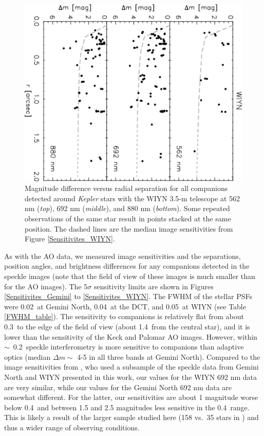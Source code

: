 \documentclass[twocolumn,appendixfloats]{aastex6}
\begin{document}
\begin{figure}[!]
\centering
\includegraphics[angle=90, scale=0.53]{WIYN_speckle_multiples.pdf}
\caption{Magnitude difference versus radial separation for all companions detected
around {\it Kepler} stars with the WIYN 3.5-m telescope at 562 nm ({\it top}),
692 nm ({\it middle}), and 880 nm ({\it bottom}). Some repeated observations
of the same star result in points stacked at the same position. The dashed 
lines are the median image sensitivities from Figure \ref {Sensitivites_WIYN}.
\label{KOIs_WIYN}}
\end{figure}

As with the AO data, we measured image sensitivities and the separations,
position angles, and brightness differences for any companions detected 
in the speckle images (note that the field of view of these images is much 
smaller than for the AO images). The 5$\sigma$ sensitivity limits are shown 
in Figures \ref{Sensitivites_Gemini} to \ref{Sensitivites_WIYN}. The FWHM 
of the stellar PSFs  were 0.02\arcsec\ at Gemini North, 0.04\arcsec\
at the DCT, and 0.05\arcsec\ at WIYN (see Table \ref{FWHM_table}).
The sensitivity to companions is relatively flat from about 0.3\arcsec\ to 
the edge of the field of view (about 1.4\arcsec\ from the central star), 
and it is lower than the sensitivity of the Keck and Palomar AO images.
However, within $\sim$~0.2\arcsec\ speckle interferometry is more
sensitive to companions than adaptive optics (median $\Delta m \sim$ 
4-5 in all three bands at Gemini North). 
Compared to the image sensitivities from \citet{horch14}, who used a 
subsample of the speckle data from Gemini North and WIYN presented 
in this work, our values for the WIYN 692 nm data are very similar, 
while our values for the Gemini North 692 nm data are somewhat
different. For the latter, our sensitivities are about 1 magnitude worse
below 0.4\arcsec\ and between 1.5 and 2.5 magnitudes less sensitive
in the 0.4\arcsec-1.2\arcsec\ range. This is likely a result of the larger 
sample studied here (158 vs.\ 35 stars in \citealt{horch14}) and thus 
a wider range of observing conditions.
\end{document}
